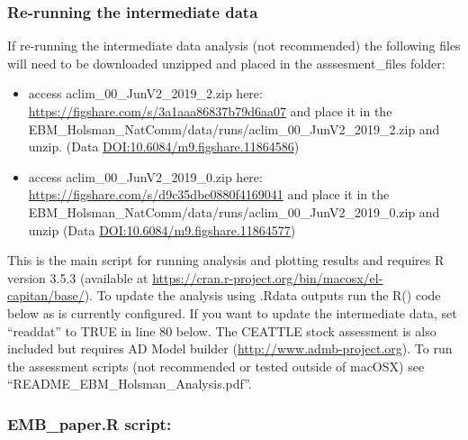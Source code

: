 \documentclass[]{article}
\begin{document}
\subsubsection{Re-running the intermediate
data}\label{re-running-the-intermediate-data}

If re-running the intermediate data analysis (not recommended) the
following files will need to be downloaded unzipped and placed in the
asssesment\_files folder:

\begin{itemize}
\item
  access aclim\_00\_JunV2\_2019\_2.zip here:
  \url{https://figshare.com/s/3a1aaa86837b79d6aa07} and place it in the
  EBM\_Holsman\_NatComm/data/runs/aclim\_00\_JunV2\_2019\_2.zip and
  unzip. (Data \url{DOI:10.6084/m9.figshare.11864586})
\item
  access aclim\_00\_JunV2\_2019\_0.zip here:
  \url{https://figshare.com/s/d9c35dbe0880f4169041} and place it in the
  EBM\_Holsman\_NatComm/data/runs/aclim\_00\_JunV2\_2019\_0.zip and
  unzip (Data \url{DOI:10.6084/m9.figshare.11864577})
\end{itemize}

This is the main script for running analysis and plotting results and
requires R version 3.5.3 (available at
\url{https://cran.r-project.org/bin/macosx/el-capitan/base/}). To update
the analysis using .Rdata outputs run the R() code below as is currently
configured. If you want to update the intermediate data, set ``readdat''
to TRUE in line 80 below. The CEATTLE stock assessment is also included
but requires AD Model builder (\url{http://www.admb-project.org}). To
run the assessment scripts (not recommended or tested outside of macOSX)
see ``README\_EBM\_Holsman\_Analysis.pdf''.

\subsubsection{EMB\_paper.R script:}\label{emb_paper.r-script}
\end{document}
